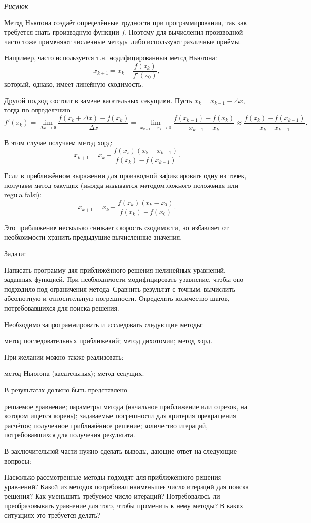 \emph{Рисунок}

Метод Ньютона создаёт определённые трудности при программировании,
так как требуется знать производную функции $f$. Поэтому для вычисления
производной часто тоже применяют численные методы либо используют
различные приёмы.

Например, часто используется т.н. модифицированный метод Ньютона:
\[
x_{k+1}=x_{k}-\frac{f(x_{k})}{f'(x_{0})},
\]
который, однако, имеет линейную сходимость.

Другой подход состоит в замене касательных секущими. Пусть
$x_{k}=x_{k-1}-\Delta x,$ тогда по определению
\[
f'(x_{k})=\lim_{\Delta x\rightarrow0}\frac{f(x_{k}+\Delta x)-f(x_{k})}{\Delta x}=\lim_{x_{k-1}-x_{k}\rightarrow0}\frac{f(x_{k-1})-f(x_{k})}{x_{k-1}-x_{k}}\approx\frac{f(x_{k})-f(x_{k-1})}{x_{k}-x_{k-1}}.
\]


В этом случае получаем метод хорд:
\[
x_{k+1}=x_{k}-\frac{f(x_{k})(x_{k}-x_{k-1})}{f(x_{k})-f(x_{k-1})}.
\]


Если в приближённом выражении для производной зафиксировать одну из
точек, получаем метод секущих (иногда называется методом ложного положения
или regula falsi):
\[
x_{k+1}=x_{k}-\frac{f(x_{k})(x_{k}-x_{0})}{f(x_{k})-f(x_{0})}.
\]


Это приближение несколько снижает скорость сходимости, но избавляет от
необхоимости хранить предыдущие вычисленные значения.

\Practice

\Tasks
Задачи:

Написать программу для приближённого решения нелинейных уравнений,
заданных функцией. При необходимости модифицировать уравнение, чтобы
оно подходило под ограничения метода. Сравнить результат с точным,
вычислить абсолютную и относительную погрешности. Определить количество
шагов, потребовавшихся для поиска решения.

Необходимо запрограммировать и исследовать следующие методы:

метод последовательных приближений; метод дихотомии; метод хорд.

При желании можно также реализовать:

метод Ньютона (касательных); метод секущих.

В результатах должно быть представлено:

решаемое уравнение; параметры метода (начальное приближение или отрезок,
на котором ищется корень); задаваемые погрешности для критерия прекращения
расчётов; полученное приближённое решение; количество итераций, потребовавшихся
для получения результата.

В заключительной части нужно сделать выводы, дающие ответ на следующие
вопросы:

Насколько рассмотренные методы подходят для приближённого решения
уравнений? Какой из методов потребовал наименьшее число итераций для
поиска решения? Как уменьшить требуемое число итераций? Потребовалось
ли преобразовывать уравнение для того, чтобы применить к нему методы?
В каких ситуациях это требуется делать?

\Questions
